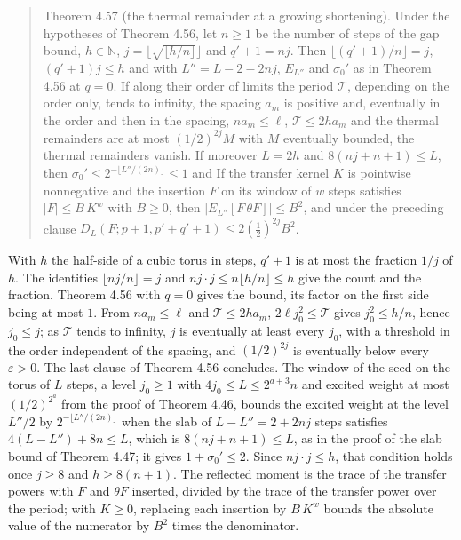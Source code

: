 \documentclass[10pt,letterpaper,twocolumn]{article}
\begin{document}
\begin{quote}
Theorem 4.57 (the thermal remainder at a growing shortening). Under the hypotheses of Theorem 4.56, let \(n\ge1\) be the number of steps of the gap bound, \(h\in\mathbb N\), \(j=\lfloor\sqrt{\lfloor h/n\rfloor}\rfloor\) and \(q'+1=nj\). Then \(\lfloor(q'+1)/n\rfloor=j\), \((q'+1)j\le h\) and
with \(L''=L-2-2nj\), \(E_{L''}\) and \(\sigma_0'\) as in Theorem 4.56 at \(q=0\). If along their order of limits the period \(\mathcal T\), depending on the order only, tends to infinity, the spacing \(a_m\) is positive and, eventually in the order and then in the spacing, \(na_m\le\ell\), \(\mathcal T\le2ha_m\) and the thermal remainders are at most \((1/2)^{2j}M\) with \(M\) eventually bounded, the thermal remainders vanish. If moreover \(L=2h\) and \(8(nj+n+1)\le L\), then \(\sigma_0'\le2^{-\lfloor L''/(2n)\rfloor}\le1\) and
If the transfer kernel \(K\) is pointwise nonnegative and the insertion \(F\) on its window of \(w\) steps satisfies \(|F|\le B\,K^{w}\) with \(B\ge0\), then \(|E_{L''}[F\,\theta F]|\le B^2\), and under the preceding clause \(D_L(F;p+1,p'+q'+1)\le2\left(\tfrac12\right)^{2j}B^2\).
\end{quote}

With \(h\) the half-side of a cubic torus in steps, \(q'+1\) is at most the fraction \(1/j\) of \(h\). The identities \(\lfloor nj/n\rfloor=j\) and \(nj\cdot j\le n\lfloor h/n\rfloor\le h\) give the count and the fraction. Theorem 4.56 with \(q=0\) gives the bound, its factor on the first side being at most \(1\). From \(na_m\le\ell\) and \(\mathcal T\le2ha_m\), \(2\ell j_0^2\le\mathcal T\) gives \(j_0^2\le h/n\), hence \(j_0\le j\); as \(\mathcal T\) tends to infinity, \(j\) is eventually at least every \(j_0\), with a threshold in the order independent of the spacing, and \((1/2)^{2j}\) is eventually below every \(\varepsilon>0\). The last clause of Theorem 4.56 concludes. The window of the seed on the torus of \(L\) steps, a level \(j_0\ge1\) with \(4j_0\le L\le2^{a+3}n\) and excited weight at most \((1/2)^{2^a}\) from the proof of Theorem 4.46, bounds the excited weight at the level \(L''/2\) by \(2^{-\lfloor L''/(2n)\rfloor}\) when the slab of \(L-L''=2+2nj\) steps satisfies \(4(L-L'')+8n\le L\), which is \(8(nj+n+1)\le L\), as in the proof of the slab bound of Theorem 4.47; it gives \(1+\sigma_0'\le2\). Since \(nj\cdot j\le h\), that condition holds once \(j\ge8\) and \(h\ge8(n+1)\). The reflected moment is the trace of the transfer powers with \(F\) and \(\theta F\) inserted, divided by the trace of the transfer power over the period; with \(K\ge0\), replacing each insertion by \(B\,K^{w}\) bounds the absolute value of the numerator by \(B^2\) times the denominator.
\end{document}
